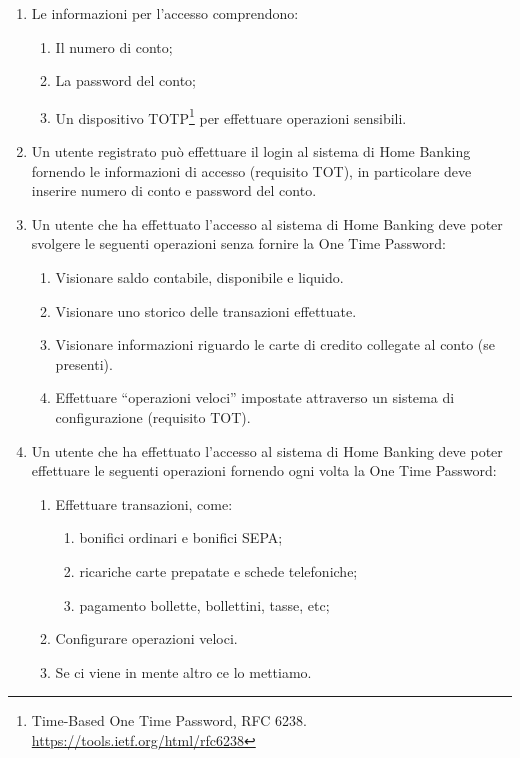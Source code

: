 \documentclass[10pt]{softeng} %
\begin{document}
\begin{enumerate}
		Un utente non pre-registrato pu\`o effettuare la procedura completa di registrazione presso una filiale, fornendo le stesse informazioni richieste agli utenti che si pre-registrano online.
	\item Le informazioni per l'accesso comprendono:
		\begin{enumerate}
			\item Il numero di conto;
			\item La password del conto;
			\item Un dispositivo TOTP\footnote{Time-Based One Time Password, RFC 6238. \url{https://tools.ietf.org/html/rfc6238}} per effettuare operazioni sensibili.
		\end{enumerate}
	\item Un utente registrato pu\`o effettuare il login al sistema di Home Banking fornendo le informazioni di accesso (requisito TOT), in particolare deve inserire numero di conto e password del conto.
	\item Un utente che ha effettuato l'accesso al sistema di Home Banking deve poter svolgere le seguenti operazioni senza fornire la One Time Password:
		\begin{enumerate}
			\item Visionare saldo contabile, disponibile e liquido.
			\item Visionare uno storico delle transazioni effettuate.
			\item Visionare informazioni riguardo le carte di credito collegate al conto (se presenti).
			\item Effettuare ``operazioni veloci'' impostate attraverso un sistema di configurazione (requisito TOT).
		\end{enumerate}
	\item Un utente che ha effettuato l'accesso al sistema di Home Banking deve poter effettuare le seguenti operazioni fornendo ogni volta la One Time Password:
		\begin{enumerate}
			\item Effettuare transazioni, come:
				\begin{enumerate}
					\item bonifici ordinari e bonifici SEPA;
					\item ricariche carte prepatate e schede telefoniche;
					\item pagamento bollette, bollettini, tasse, etc;
				\end{enumerate}
			\item Configurare operazioni veloci.
			\item Se ci viene in mente altro ce lo mettiamo.

\end{enumerate}
\end{enumerate}
\end{document}
